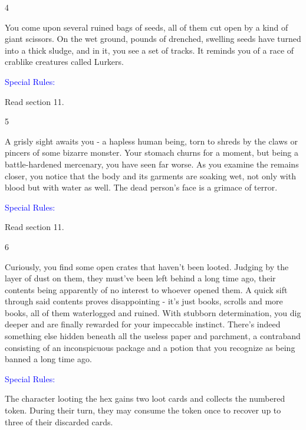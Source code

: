 \documentclass[fontsize=11pt]{scrartcl}
\begin{document}
\begin{multicols}{3}
\begin{center}
		  {\myfont\large{\textcolor{Sepia}{4}}}
		\end{center}
		\footnotesize{You come upon several ruined bags of seeds, all of them cut open by a kind of giant scissors. On the wet ground, pounds of drenched, swelling seeds have turned into a thick sludge, and in it, you see a set of tracks. It reminds you of a race of crablike creatures called Lurkers.}
		\begin{center}
	    {\myfont\normalsize{\textcolor{Blue}{Special Rules:}}}
		\end{center}
		\footnotesize{Read section 11.}
		\begin{center}
		  {\myfont\large{\textcolor{Sepia}{5}}}
		\end{center}
		\footnotesize{A grisly sight awaits you - a hapless human being, torn to shreds by the claws or pincers of some bizarre monster. Your stomach churns for a moment, but being a battle-hardened mercenary, you have seen far worse. As you examine the remains closer, you notice that the body and its garments are soaking wet, not only with blood but with water as well. The dead person’s face is a grimace of terror.}
		\begin{center}
	    {\myfont\normalsize{\textcolor{Blue}{Special Rules:}}}
		\end{center}
		\footnotesize{Read section 11.}
		\begin{center}
		 {\myfont \large{\textcolor{Sepia}{6}}}
		\end{center}
		\footnotesize{Curiously, you find some open crates that haven’t been looted. Judging by the layer of dust on them, they must’ve been left behind a long time ago, their contents being apparently of no interest to whoever opened them. A quick sift through said contents proves disappointing - it’s just books, scrolls and more books, all of them waterlogged and ruined. With stubborn determination, you dig deeper and are finally rewarded for your impeccable instinct. There’s indeed something else hidden beneath all the useless paper and parchment, a contraband consisting of an inconspicuous package and a potion that you recognize as being banned a long time ago.}
		\begin{center}
	    {\myfont\normalsize{\textcolor{Blue}{Special Rules:}}}
		\end{center}
		\footnotesize{The character looting the hex gains two loot cards and collects the numbered token. During their turn, they may consume the token once to recover up to three of their discarded cards.}
		\begin{center}

\end{center}
\end{multicols}
\end{document}
